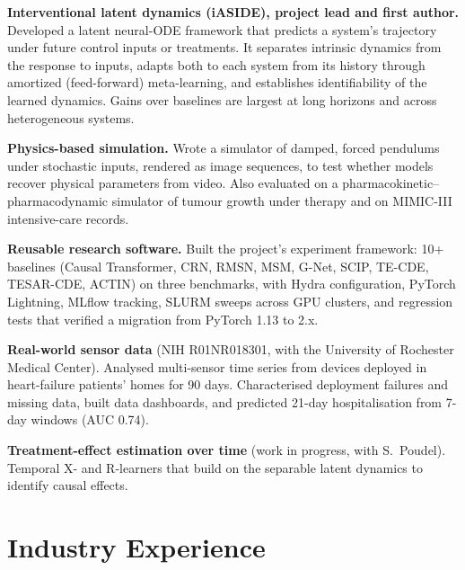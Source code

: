 \documentclass[10pt, letterpaper]{article}
\begin{document}
    \vspace{0.10 cm}
    \begin{onecolentry}
        \begin{highlights}
            \item \textbf{Interventional latent dynamics (iASIDE), project lead and first author.} Developed a latent
            neural-ODE framework that predicts a system's trajectory under future control inputs or treatments. It
            separates intrinsic dynamics from the response to inputs, adapts both to each system from its history
            through amortized (feed-forward) meta-learning, and establishes identifiability of the learned
            dynamics. Gains over baselines are largest at long horizons and across heterogeneous systems.
            \item \textbf{Physics-based simulation.} Wrote a simulator of damped, forced pendulums under stochastic
            inputs, rendered as image sequences, to test whether models recover physical parameters from video.
            Also evaluated on a pharmacokinetic--pharmacodynamic simulator of tumour growth under therapy and on
            MIMIC-III intensive-care records.
            \item \textbf{Reusable research software.} Built the project's experiment framework: 10+ baselines
            (Causal Transformer, CRN, RMSN, MSM, G-Net, SCIP, TE-CDE, TESAR-CDE, ACTIN) on three benchmarks, with
            Hydra configuration, PyTorch Lightning, MLflow tracking, SLURM sweeps across GPU clusters, and
            regression tests that verified a migration from PyTorch 1.13 to 2.x.
            \item \textbf{Real-world sensor data} (NIH R01NR018301, with the University of Rochester Medical
            Center). Analysed multi-sensor time series from devices deployed in heart-failure patients' homes for
            90 days. Characterised deployment failures and missing data, built data dashboards, and
            predicted 21-day hospitalisation from 7-day windows (AUC 0.74).
            \item \textbf{Treatment-effect estimation over time} (work in progress, with S.\ Poudel). Temporal X- and
            R-learners that build on the separable latent dynamics to identify causal effects.
        \end{highlights}
    \end{onecolentry}


    \section{Industry Experience}
\end{document}
